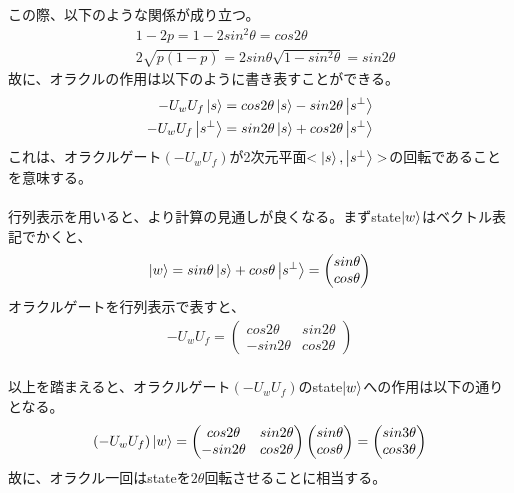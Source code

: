 \documentclass[a4paper,10.5pt]{article}
\numberwithin{equation}{section}
\begin{document}
この際、以下のような関係が成り立つ。
\begin{align*}
    &1-2p=1-2sin^{2}\theta=cos 2\theta\\
    &2\sqrt{p(1-p)}=2sin\theta \sqrt{1-sin^{2}\theta}= sin2\theta
\end{align*}
故に、オラクルの作用は以下のように書き表すことができる。
\begin{align*}
    -U_{w}U_{f}\ket{s}&=cos2\theta \ket{s}-sin2\theta \ket{s^{\perp}}\\
    -U_{w}U_{f}\ket{s^{\perp}}&=sin2\theta\ket{s}+cos2\theta \ket{s^{\perp}}
\end{align*}
これは、オラクルゲート$(-U_{w}U_{f})$が2次元平面$<\ket{s},\ket{s^{\perp}}>$の回転であることを意味する。\\
\\
行列表示を用いると、より計算の見通しが良くなる。まずstate$\ket{w}$はベクトル表記でかくと、
\begin{align*}
    \ket{w}=sin\theta\ket{s}+cos\theta \ket{s^{\perp}}=
    \begin{pmatrix}
   sin\theta \\ cos\theta
    \end{pmatrix}
\end{align*}
オラクルゲートを行列表示で表すと、
\begin{align*}
    -U_{w}U_{f}= \begin{pmatrix}
   cos2\theta & sin2\theta \\-sin2\theta & cos2\theta
    \end{pmatrix}
\end{align*}
\\
以上を踏まえると、オラクルゲート$(-U_{w}U_{f})$のstate$\ket{w}$への作用は以下の通りとなる。
\begin{align*}
    (-U_{w}U_{f})\ket{w}= \begin{pmatrix}
   cos2\theta & sin2\theta \\-sin2\theta & cos2\theta
    \end{pmatrix}
    \begin{pmatrix}
   sin\theta \\ cos\theta
    \end{pmatrix}=\begin{pmatrix}
   sin3\theta \\ cos3\theta
    \end{pmatrix}
\end{align*}
故に、オラクル一回はstateを$2\theta$回転させることに相当する。\\
\\
\end{document}
